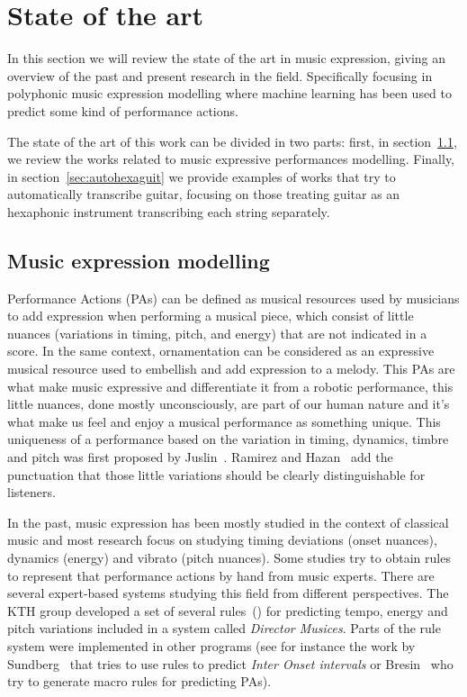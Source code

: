 \normallinespacing
\chapter{State of the art}
\label{chap:sota}
In this section we will review the state of the art in music expression, giving an
overview of the past and present research in the field. Specifically focusing in polyphonic music expression modelling where machine learning has been used to predict some kind of performance actions.

The state of the art of this work can be divided in two parts: first, in section~\ref{sec:muexpmod}, we review the works related to music expressive performances modelling. Finally, in section~\ref{sec:autohexaguit} we provide examples of works that try to automatically transcribe guitar, focusing on those treating guitar as an hexaphonic instrument transcribing each string separately. 

\section{Music expression modelling}
\label{sec:muexpmod}

Performance Actions (PAs) can be defined as musical resources used by musicians to add expression when performing a musical piece, which consist of little nuances (variations in timing, pitch, and energy) that are not indicated in a score. In the same context, ornamentation can be considered as an expressive musical resource used to embellish and add expression to a melody. This PAs are what make music expressive and differentiate it from a robotic performance, this little nuances, done mostly unconsciously, are part of our human nature and it's what make us feel and enjoy a musical performance as something unique. This uniqueness of a performance based on the variation in timing, dynamics, timbre and pitch was first proposed by Juslin~\cite{Juslin2001}. Ramirez and Hazan~\cite{Ramirez2006} add the punctuation that those little variations should be clearly distinguishable for listeners.

In the past, music expression has been mostly studied in the context of classical music and most research focus on studying timing deviations (onset nuances), dynamics (energy) and vibrato (pitch nuances). Some studies try to obtain rules to represent that performance actions by hand from music experts. There are several expert-based systems studying this field from different perspectives. The KTH group developed a set of several rules~(\cite{Friberg2009}) for predicting tempo, energy and pitch variations included in a system called \textit{Director Musices}. Parts of the rule system were implemented in other programs (see for instance the work by Sundberg~\cite{Sundberg2003} that tries to use rules to predict \textit{Inter Onset intervals} or Bresin~\cite{Bresin2000} who try to generate macro rules for predicting PAs).

